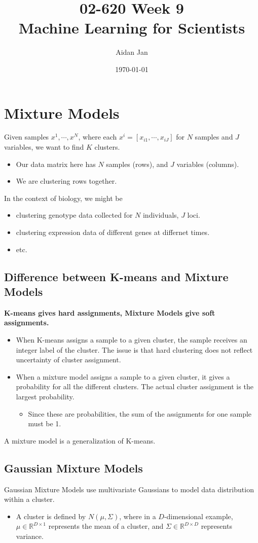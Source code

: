 \documentclass[10pt]{article}
\title{02-620 Week 9 \\ \large{Machine Learning for Scientists}}
\author{Aidan Jan}
\date{\today}
\begin{document}
\maketitle

\section*{Mixture Models}
Given samples $x^1, \cdots, x^N$, where each $x^i = [x_{i1}, \cdots, x_{iJ}]$ for $N$ samples and $J$ variables, we want to find $K$ clusters.
\begin{itemize}
	\item Our data matrix here has $N$ samples (rows), and $J$ variables (columns).
	\item We are clustering rows together.
\end{itemize}
In the context of biology, we might be
\begin{itemize}
	\item clustering genotype data collected for $N$ individuals, $J$ loci.
	\item clustering expression data of different genes at differnet times.
	\item etc.
\end{itemize}

\subsection*{Difference between K-means and Mixture Models}
\textbf{K-means gives hard assignments, Mixture Models give soft assignments.}
\begin{itemize}
	\item When K-means assigns a sample to a given cluster, the sample receives an integer label of the cluster.  The issue is that hard clustering does not reflect uncertainty of cluster assignment.
	\item When a mixture model assigns a sample to a given cluster, it gives a probability for all the different clusters.  The actual cluster assignment is the largest probability.
	\begin{itemize}
	    \item Since these are probabilities, the sum of the assignments for one sample must be 1.
    \end{itemize}
\end{itemize}
A mixture model is a generalization of K-means.

\subsection*{Gaussian Mixture Models}
Gaussian Mixture Models use multivariate Gaussians to model data distribution within a cluster. 
\begin{itemize}
	\item A cluster is defined by $N(\mu, \Sigma)$, where in a $D$-dimensional example, $\mu \in \mathbb{R}^{D \times 1}$ represents the mean of a cluster, and $\Sigma \in \mathbb{R}^{D \times D}$ represents variance.
\end{itemize}
\end{document}
